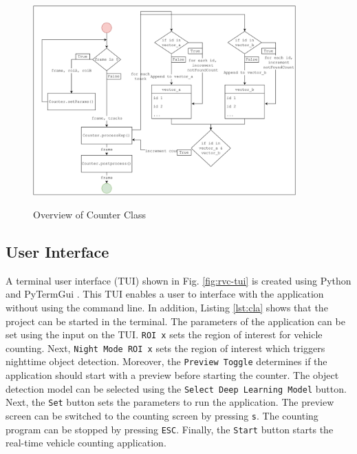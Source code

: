 \documentclass[12pt,a4paper,fleqn]{report}
\begin{document}
\begin{figure}[htbp]
    \begin{center}
        \includegraphics[width=0.9\textwidth,height=8cm]{figures/counterflow.png}
    \end{center}
    \caption{Overview of Counter Class}
    \label{fig:counterflow}
\end{figure}


\subsection{User Interface}
A terminal user interface (TUI) shown in Fig. \ref{fig:rvc-tui} is created using Python and PyTermGui \cite{pytermgui:2022}.
This TUI enables a user to interface with the application without using the command line.
In addition, Listing \ref{lst:cla} shows that the project can be started in the terminal.
The parameters of the application can be set using the input on the TUI.
\texttt{ROI x} sets the region of interest for vehicle counting.
Next, \texttt{Night Mode ROI x} sets the region of interest which triggers nighttime object
detection.
Moreover, the \texttt{Preview Toggle} determines if the application should start with a
preview before starting the counter.
The object detection model can be selected using the \texttt{Select Deep Learning Model}
button.
Next, the \texttt{Set} button sets the parameters to run the application.
The preview screen can be switched to the counting screen by pressing \texttt{s}.
The counting program can be stopped by pressing \texttt{ESC}.
Finally, the \texttt{Start} button starts the real-time vehicle counting application.
\end{document}
